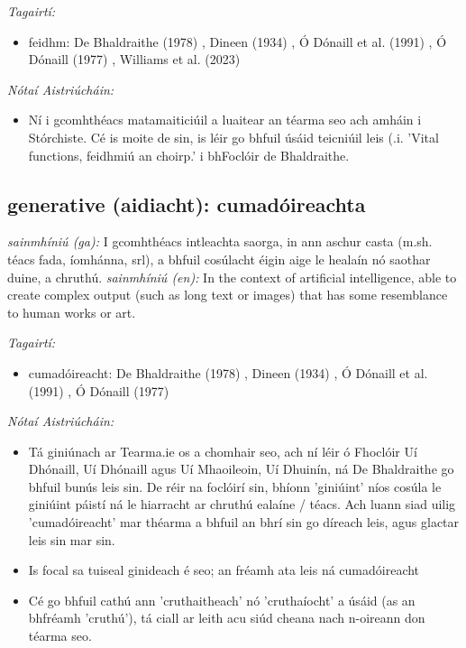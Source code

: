 \documentclass{article}
\begin{document}
 \noindent \textit{Tagairtí:}
\begin{itemize}
	\item feidhm: De Bhaldraithe (1978) \cite{de-bhaldraithe}, Dineen (1934) \cite{dineen}, Ó Dónaill et al. (1991) \cite{focloir-beag}, Ó Dónaill (1977) \cite{odonaill}, Williams et al. (2023) \cite{storchiste}
\end{itemize}

 \noindent \textit{Nótaí Aistriúcháin:}
\begin{itemize}
	\item Ní i gcomhthéacs matamaiticiúil a luaitear an téarma seo ach amháin i Stórchiste. Cé is moite de sin, is léir go bhfuil úsáid teicniúil leis (.i. 'Vital functions, feidhmiú an choirp.' i bhFoclóir de Bhaldraithe.
\end{itemize}


\subsection*{generative (aidiacht): cumadóireachta} 
 \noindent \textit{sainmhíniú (ga):} I gcomhthéacs intleachta saorga, in ann aschur casta (m.sh. téacs fada, íomhánna, srl), a bhfuil cosúlacht éigin aige le healaín nó saothar duine, a chruthú.
\newline\newline
 \noindent \textit{sainmhíniú (en):} In the context of artificial intelligence, able to create complex output (such as long text or images) that has some resemblance to human works or art.
\newline

 \noindent \textit{Tagairtí:}
\begin{itemize}
	\item cumadóireacht: De Bhaldraithe (1978) \cite{de-bhaldraithe}, Dineen (1934) \cite{dineen}, Ó Dónaill et al. (1991) \cite{focloir-beag}, Ó Dónaill (1977) \cite{odonaill}
\end{itemize}

 \noindent \textit{Nótaí Aistriúcháin:}
\begin{itemize}
	\item Tá giniúnach ar Tearma.ie os a chomhair seo, ach ní léir ó Fhoclóir Uí Dhónaill, Uí Dhónaill agus Uí Mhaoileoin, Uí Dhuinín, ná De Bhaldraithe go bhfuil bunús leis sin. De réir na foclóirí sin, bhíonn 'giniúint' níos cosúla le giniúint páistí ná le hiarracht ar chruthú ealaíne / téacs. Ach luann siad uilig 'cumadóireacht' mar théarma a bhfuil an bhrí sin go díreach leis, agus glactar leis sin mar sin.
	\item Is focal sa tuiseal ginideach é seo; an fréamh ata leis ná cumadóireacht
	\item Cé go bhfuil cathú ann 'cruthaitheach' nó 'cruthaíocht' a úsáid (as an bhfréamh 'cruthú'), tá ciall ar leith acu siúd cheana nach n-oireann don téarma seo.
\end{itemize}
\end{document}
